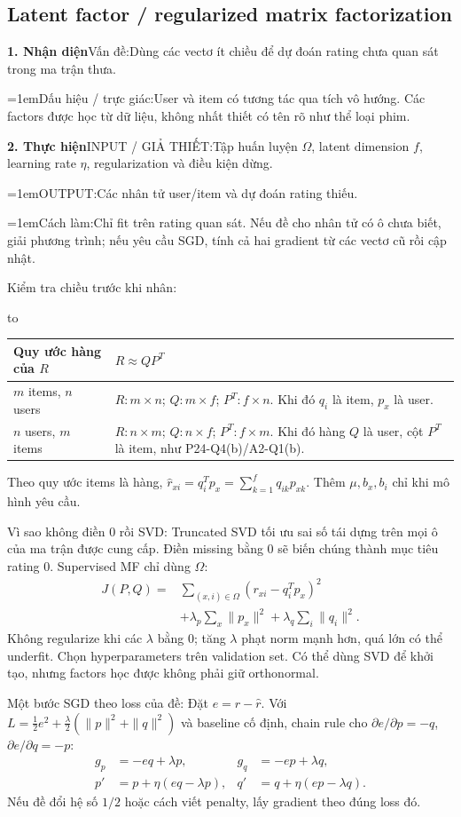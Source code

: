 \documentclass[10pt,a4paper,twocolumn]{article}
\newif\ifexamheadingprinted
\newcommand{\topic}[2]{%
  \global\examheadingprintedfalse\par\subsection{#2}\label{topic:#1}}
\newcommand{\key}[1]{#1:\enspace}
\newenvironment{examtable}[1]{%
  \par\addvspace{2pt}\noindent\hbox to \linewidth\bgroup\hfil
  \setlength{\tabcolsep}{4pt}%
  \renewcommand{\arraystretch}{1.12}\begin{tabular}{#1}%
}{\end{tabular}\hfil\egroup\par\addvspace{2pt}}
\newcommand{\algfield}[2]{\par\noindent\hangindent=1em\relax#1:\enspace#2}
\newcommand{\unitfield}[4]{%
  \par\noindent\textbf{#1. #2}\enspace #3:\enspace #4}
\newcommand{\algsummary}[6]{%
  \begingroup\setlength{\parskip}{1pt}%
  \unitfield{1}{Nhận diện}{Vấn đề}{#1}%
  \algfield{Dấu hiệu / trực giác}{#2}%
  \if\relax\detokenize{#3}\relax\else\par\noindent#3\par\fi%
  \unitfield{2}{Thực hiện}{INPUT / GIẢ THIẾT}{#4}%
  \algfield{OUTPUT}{#5}%
  \algfield{Cách làm}{#6}\par\endgroup}
\begin{document}
\topic{factors}{Latent factor / regularized matrix factorization}

\algsummary{Dùng các vectơ ít chiều để dự đoán rating chưa quan sát trong ma trận thưa.}{User và item có tương tác qua tích vô hướng. Các factors được học từ dữ liệu, không nhất thiết có tên rõ như thể loại phim.}{}{Tập huấn luyện $\Omega$, latent dimension $f$, learning rate $\eta$, regularization và điều kiện dừng.}{Các nhân tử user/item và dự đoán rating thiếu.}{Chỉ fit trên rating quan sát. Nếu đề cho nhân tử có ô chưa biết, giải phương trình; nếu yêu cầu SGD, tính cả hai gradient từ các vectơ cũ rồi cập nhật.}

\key{Kiểm tra chiều trước khi nhân}
\begin{examtable}{@{}p{}p{}@{}}
\toprule
Quy ước hàng của $R$ & $R\approx QP^T$ \\
\midrule
$m$ items, $n$ users & $R:m\times n$; $Q:m\times f$; $P^T:f\times n$. Khi đó $q_i$ là item, $p_x$ là user. \\
$n$ users, $m$ items & $R:n\times m$; $Q:n\times f$; $P^T:f\times m$. Khi đó hàng $Q$ là user, cột $P^T$ là item, như P24-Q4(b)/A2-Q1(b). \\
\bottomrule
\end{examtable}
Theo quy ước items là hàng, $\hat r_{xi}=q_i^Tp_x=\sum_{k=1}^{f}q_{ik}p_{xk}$. Thêm $\mu,b_x,b_i$ chỉ khi mô hình yêu cầu.

\key{Vì sao không điền 0 rồi SVD} Truncated SVD tối ưu sai số tái dựng trên mọi ô của ma trận được cung cấp. Điền missing bằng 0 sẽ biến chúng thành mục tiêu rating 0. Supervised MF chỉ dùng $\Omega$:
\begin{align*}
J(P,Q)={}&\sum_{(x,i)\in\Omega}(r_{xi}-q_i^Tp_x)^2\\
&+\lambda_p\sum_x\|p_x\|^2+\lambda_q\sum_i\|q_i\|^2.
\end{align*}
Không regularize khi các $\lambda$ bằng 0; tăng $\lambda$ phạt norm mạnh hơn, quá lớn có thể underfit. Chọn hyperparameters trên validation set. Có thể dùng SVD để khởi tạo, nhưng factors học được không phải giữ orthonormal.

\key{Một bước SGD theo loss của đề} Đặt $e=r-\hat r$. Với $L=\frac12e^2+\frac\lambda2(\|p\|^2+\|q\|^2)$ và baseline cố định, chain rule cho $\partial e/\partial p=-q$, $\partial e/\partial q=-p$:
\begin{align*}
g_p&=-eq+\lambda p,&g_q&=-ep+\lambda q,\\
p'&=p+\eta(eq-\lambda p),&
q'&=q+\eta(ep-\lambda q).
\end{align*}
Nếu đề đổi hệ số $1/2$ hoặc cách viết penalty, lấy gradient theo đúng loss đó.
\end{document}
